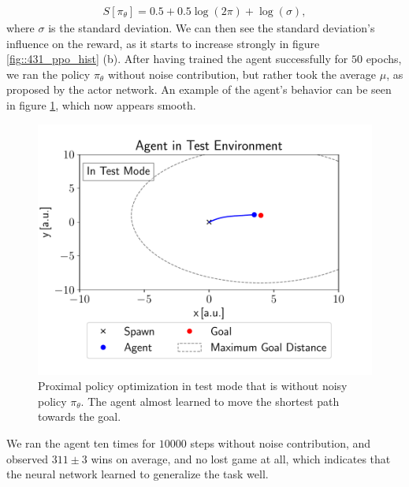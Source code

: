 \begin{align}
S[\pi_\theta] = 0.5 + 0.5\log(2\pi)+\log(\sigma),
\end{align}
where $\sigma$ is the standard deviation. We can then see the standard deviation's influence on the reward, as it starts to increase strongly in figure \ref{fig::431_ppo_hist} (b). After having trained the agent successfully for $50$ epochs, we ran the policy $\pi_\theta$ without noise contribution, but rather took the average $\mu$, as proposed by the actor network. An example of the agent's behavior can be seen in figure \ref{fig::431_ppo_test}, which now appears smooth. 
\begin{figure}[h!]
	\centering
	\includegraphics[scale=.45]{chapters/04_experiments/02_autonomous_walking/test_mode.pdf}
	\caption{Proximal policy optimization in test mode that is without noisy policy $\pi_\theta$. The agent almost learned to move the shortest path towards the goal.}	
	\label{fig::431_ppo_test}
\end{figure}
We ran the agent ten times for $10000$ steps without noise contribution, and observed $311\pm3$ wins on average, and no lost game at all, which indicates that the neural network learned to generalize the task well.
